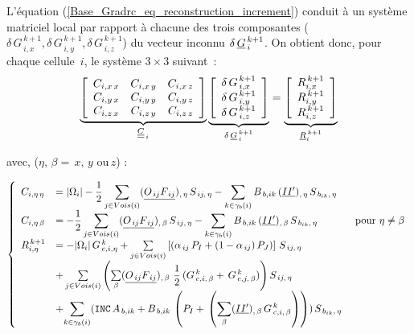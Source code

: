 L'\'equation (\ref{Base_Gradrc_eq_reconstruction_increment}) conduit \`a un syst\`eme matriciel local par rapport \`a chacune des trois composantes (${\delta\,G}^{\,k+1}_{\,i,x},{\delta\,G}^{\,k+1}_{\,i,y},{\delta\,G}^{\,k+1}_{\,i,z}$) du vecteur
inconnu $ \delta\,\underline{G}^{\,k+1}_{\,i}$. On obtient donc, pour chaque cellule~$i$, le syst\`eme $3\times3$ suivant~:
\begin{equation}\label{Base_Gradrc_eq_systeme_matriciel_gradrc}
\underbrace{
\left[\begin{array}{ccc}
\displaystyle
C_{i,x\,x}
& C_{i,x\,y}
& C_{i,x\,z}\\
\displaystyle
C_{i,y\,x}
& C_{i,y\,y}
& C_{i,y\,z}\\
\displaystyle
C_{i,z\,x}
& C_{i,z\,y}
& C_{i,z\,z}
\end{array}\right]
}_{\underline{\underline{C}}_{\,i}}
\underbrace{
\left[\begin{array}{c}
{\delta\,G}^{\,k+1}_{\,i,x}\\{\delta\,G}^{\,k+1}_{\,i,y}  \\ {\delta\,G}^{\,k+1}_{\,i,z}
\end{array}\right]
}_{\delta\,\underline{G}^{\,k+1}_{\,i}}
=
\underbrace{
\left[\begin{array}{c}
\displaystyle
R^{\,k+1}_{i,x}\\
\displaystyle
R^{\,k+1}_{i,y}\\
\displaystyle
R^{\,k+1}_{i,z}
\end{array}\right]
}_{\underline{R}^{\,k+1}_{i}}
\end{equation}

avec, ($\eta ,\,\beta = \, x, \,y\,\, \text{ou} \, z$) :

\begin{equation}\label{Base_Gradrc_eq_second_membre}
\left\{\begin{array}{lll}
C_{i,\eta\,\eta} &= |\Omega _i| - \displaystyle \frac{1}{2}\sum\limits_{j\in
Vois(i)}(\underline{O_{\,ij}F_{\,ij}})_{,\,\eta}\,S_{\,ij,\,\eta} -\sum\limits_{k\in
\gamma_b(i)} B_{\,b,ik}\,(\underline{II'})_{,\,\eta}\,S_{\,{b}_{ik},\,\eta}\\
C_{i,\eta\,\beta} &= - \displaystyle \frac{1}{2}\sum\limits_{j\in
Vois(i)}(\underline{O_{\,ij}F_{\,ij}})_{,\,\beta}\,S_{\,{ij},\,\eta}
 -\sum\limits_{k\in \gamma_b(i)}
B_{\,b,ik}\,(\underline{II'})_{,\,\beta}\,S_{\,{b}_{ik},\,\eta}  &\text{ pour $\eta
\ne \beta$}\\
R^{\,k+1}_{i,\eta} &=  -|\Omega_i|\,{G}^{\,k}_{\,c,i,\eta}
 + \sum\limits_{j\in Vois(i)}\left[
(\alpha_{\,ij}\,P_I + (1 - \alpha_{\,ij})\,P_J)\right]\,{{S}_{\,ij,\,\eta}}\\
&+ \sum\limits_{j\in Vois(i)}\left(\sum\limits_{\beta}(\underline{O_{\,ij}F_{\,ij}})_{,\,\beta}\,\,\displaystyle\frac{1}{2}\,({G}^{\,k}_{\,c,i,\,\beta}+\,{G}^{\,k}_{\,c,j,\,\beta})\right){S}_{\,ij,\,\eta}\\
&+\displaystyle{\sum\limits_{k\in {\gamma_b(i)}}(\ensuremath{\text{\texttt{INC}}}\,A_{\,b,ik} +
B_{\,b,ik}\,\left(P_{I} + \,\left(\sum\limits_{\beta}(\underline{II'})_{,\,\beta}\,{G}^{\,k}_{\,c,i,\,\beta}\right)\right))\,{S}_{\,{b}_{ik},\,\eta}}
\end{array}\right.
\end{equation}


